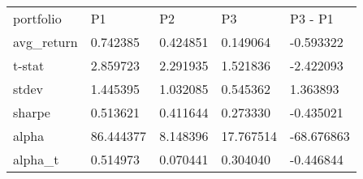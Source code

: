 \begin{tabular}{lllll}
\toprule
\midrule
portfolio & P1 & P2 & P3 & P3 - P1 \\
avg_return & 0.742385 & 0.424851 & 0.149064 & -0.593322 \\
t-stat & 2.859723 & 2.291935 & 1.521836 & -2.422093 \\
stdev & 1.445395 & 1.032085 & 0.545362 & 1.363893 \\
sharpe & 0.513621 & 0.411644 & 0.273330 & -0.435021 \\
alpha & 86.444377 & 8.148396 & 17.767514 & -68.676863 \\
alpha_t & 0.514973 & 0.070441 & 0.304040 & -0.446844 \\
\bottomrule
\end{tabular}
